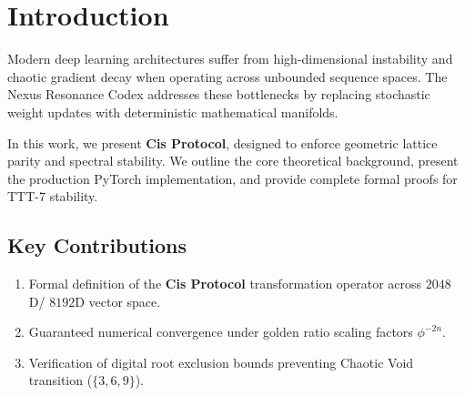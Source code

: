 \section{Introduction}
Modern deep learning architectures suffer from high-dimensional instability and chaotic gradient decay when operating across unbounded sequence spaces. The Nexus Resonance Codex addresses these bottlenecks by replacing stochastic weight updates with deterministic mathematical manifolds.

In this work, we present \textbf{Cis Protocol}, designed to enforce geometric lattice parity and spectral stability. We outline the core theoretical background, present the production PyTorch implementation, and provide complete formal proofs for TTT-7 stability.

\subsection{Key Contributions}
\begin{enumerate}[label=\textbf{\arabic*.}]
    \item Formal definition of the \textbf{Cis Protocol} transformation operator across $2048$D/ $8192$D vector space.
    \item Guaranteed numerical convergence under golden ratio scaling factors $\phi^{-2n}$.
    \item Verification of digital root exclusion bounds preventing Chaotic Void transition ($\{3, 6, 9\}$).
\end{enumerate}